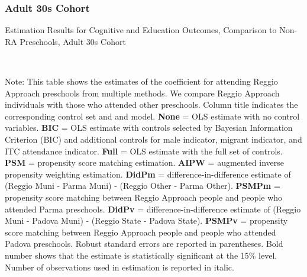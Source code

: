 \subsubsection{Adult 30s Cohort}
\begin{table}[H] \caption{Estimation Results for Cognitive and Education Outcomes, Comparison to Non-RA Preschools, Adult 30s Cohort} \label{ols-CN-adult30-reg-other}
\scalebox{0.8}{}
\vspace{1ex} \\
\footnotesize\raggedright{Note: This table shows the estimates of the coefficient for attending Reggio Approach preschools from multiple methods. We compare Reggio Approach individuals with those who attended other preschools. Column title indicates the corresponding control set and and model. \textbf{None} = OLS estimate with no control variables. \textbf{BIC} = OLS estimate with controls selected by Bayesian Information Criterion (BIC) and additional controls for male indicator, migrant indicator, and ITC attendance indicator. \textbf{Full} = OLS estimate with the full set of controls. \textbf{PSM} =  propensity score matching estimation. \textbf{AIPW} = augmented inverse propensity weighting estimation. \textbf{DidPm} = difference-in-difference estimate of (Reggio Muni - Parma Muni) - (Reggio Other - Parma Other). \textbf{PSMPm} = propensity score matching between Reggio Approach people and people who attended Parma preschools. \textbf{DidPv} = difference-in-difference estimate of (Reggio Muni - Padova Muni) - (Reggio State - Padova State). \textbf{PSMPv} = propensity score matching between Reggio Approach people and people who attended Padova preschools. Robust standard errors are reported in parentheses. Bold number shows that the estimate is statistically significant at the 15\% level. Number of observations used in estimation is reported in italic.}
\end{table}

